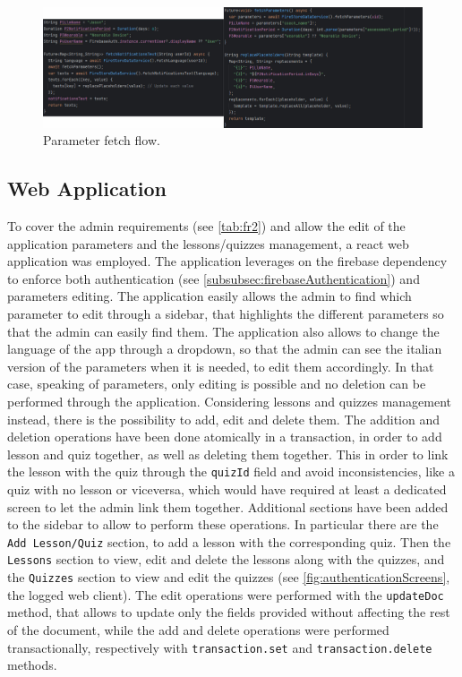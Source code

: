 \begin{figure}
    \centering
    \includegraphics[width=1.0\linewidth]{./images/parameters.jpg}
    \caption{Parameter fetch flow.}
\end{figure}

\subsection{Web Application}
To cover the admin requirements (see \cref{tab:fr2}) and allow the edit of the application parameters and the lessons/quizzes management, a react web application was employed.
\newline The application leverages on the firebase dependency \cite{Firebase} to enforce both authentication (see \cref{subsubsec:firebaseAuthentication}) and parameters editing.
\newline The application easily allows the admin to find which parameter to edit through a sidebar, that highlights the different parameters so that the admin can easily find them. The application also allows to change the language of the app through a dropdown, so that the admin can see the italian version of the parameters when it is needed, to edit them accordingly. In that case, speaking of parameters, only editing is possible and no deletion can be performed through the application.   
\newline Considering lessons and quizzes management instead, there is the possibility to add, edit and delete them. The addition and deletion operations have been done atomically in a transaction, in order to add lesson and quiz together, as well as deleting them together. This in order to link the lesson with the quiz through the \texttt{quizId} field and avoid inconsistencies, like a quiz with no lesson or viceversa, which would have required at least a dedicated screen to let the admin link them together. Additional sections have been added to the sidebar to allow to perform these operations. In particular there are the \texttt{Add Lesson/Quiz} section, to add a lesson with the corresponding quiz. Then the \texttt{Lessons} section to view, edit and delete the lessons along with the quizzes, and the \texttt{Quizzes} section to view and edit the quizzes (see \cref{fig:authenticationScreens}, the logged web client). 
\newpage \noindent The edit operations were performed with the \texttt{updateDoc} method, that allows to update only the fields provided without affecting the rest of the document, while the add and delete operations were performed transactionally, respectively with \texttt{transaction.set}  and \texttt{transaction.delete} methods.

